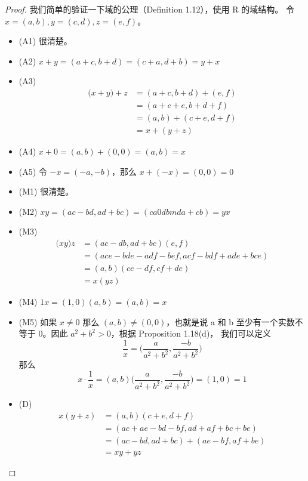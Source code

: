 \documentclass[../poma-note.tex]{subfiles}
\begin{document}
\begin{proof}
	我们简单的验证一下域的公理（Definition 1.12），使用 R 的域结构。
	令 $x=(a,b), y=(c,d), z=(e,f)$。
	\begin{itemize}
		\item[] (A1) 很清楚。
		\item[] (A2) $x+y = (a+c,b+d) = (c+a,d+b) = y+x$
		\item[] (A3)
			\vspace{-26pt}
			\begin{align*}
				\mathcal (x+y)+z & = (a+c,b+d) + (e,f) \\
				                 & = (a+c+e, b+d+f)    \\
				                 & = (a,b) + (c+e,d+f) \\
				                 & = x+(y+z)
			\end{align*}
		\item[] (A4) $x+0 = (a,b) + (0,0) = (a,b) = x$
		\item[] (A5) 令 $-x = (-a,-b)$，那么 $x+(-x) = (0,0) = 0$
		\item[] (M1) 很清楚。
		\item[] (M2) $xy = (ac-bd,ad+bc) = (ca0dbmda+cb) = yx$
		\item[] (M3)
			\vspace{-26pt}
			\begin{align*}
				\mathcal (xy)z & = (ac-db,ad+bc)(e,f)                \\
				               & = (ace-bde-adf-bef,acf-bdf+ade+bce) \\
				               & = (a,b)(ce-df,cf+de)                \\
				               & = x(yz)
			\end{align*}
		\item[] (M4) $1x  =(1,0)(a,b) = (a,b) = x$
		\item[] (M5) 如果 $x \ne 0$ 那么 $(a,b) \ne (0,0)$，也就是说 a 和 b 至少有一个实数不等于 0。因此 $a^2+b^2>0$，根据 Proposition 1.18(d)，
			我们可以定义
			\[\frac{1}{x} = \bigl(\frac{a}{a^2+b^2}, \frac{-b}{a^2+b^2}\bigr)\]
			那么
			\[x \cdot \frac{1}{x} = (a,b)\bigl(\frac{a}{a^2+b^2}, \frac{-b}{a^2+b^2}\bigr) = (1,0) = 1\]
		\item[] (D)
			\vspace{-26pt}
			\begin{align*}
				\mathcal{} x(y+z) & = (a,b)(c+e,d+f)                \\
				                  & = (ac+ae-bd-bf,ad+af+bc+be)     \\
				                  & = (ac-bd,ad+bc) + (ae-bf,af+be) \\
				                  & = xy + yz
			\end{align*}
	\end{itemize}
\end{proof}
\end{document}
